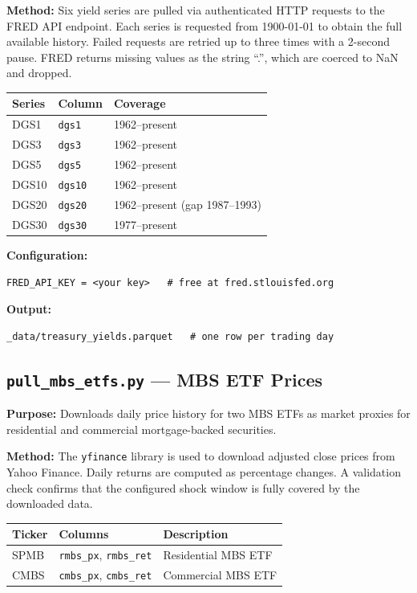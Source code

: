 \documentclass[12pt, a4paper]{article}
\begin{document}
\textbf{Method:} Six yield series are pulled via authenticated HTTP requests
to the FRED API endpoint. Each series is requested from 1900-01-01 to obtain
the full available history. Failed requests are retried up to three times with
a 2-second pause. FRED returns missing values as the string ``.'', which are
coerced to NaN and dropped.

\begin{center}
\begin{tabular}{lll}
\toprule
Series & Column & Coverage \\
\midrule
DGS1  & \texttt{dgs1}  & 1962--present \\
DGS3  & \texttt{dgs3}  & 1962--present \\
DGS5  & \texttt{dgs5}  & 1962--present \\
DGS10 & \texttt{dgs10} & 1962--present \\
DGS20 & \texttt{dgs20} & 1962--present (gap 1987--1993) \\
DGS30 & \texttt{dgs30} & 1977--present \\
\bottomrule
\end{tabular}
\end{center}

\textbf{Configuration:}
\begin{lstlisting}
FRED_API_KEY = <your key>   # free at fred.stlouisfed.org
\end{lstlisting}

\textbf{Output:}
\begin{lstlisting}
_data/treasury_yields.parquet   # one row per trading day
\end{lstlisting}

\subsection{\texttt{pull\_mbs\_etfs.py} --- MBS ETF Prices}

\textbf{Purpose:} Downloads daily price history for two MBS ETFs as market
proxies for residential and commercial mortgage-backed securities.

\textbf{Method:} The \texttt{yfinance} library is used to download adjusted
close prices from Yahoo Finance. Daily returns are computed as percentage
changes. A validation check confirms that the configured shock window is fully
covered by the downloaded data.

\begin{center}
\begin{tabular}{lll}
\toprule
Ticker & Columns & Description \\
\midrule
SPMB & \texttt{rmbs\_px}, \texttt{rmbs\_ret} & Residential MBS ETF \\
CMBS & \texttt{cmbs\_px}, \texttt{cmbs\_ret} & Commercial MBS ETF  \\
\bottomrule
\end{tabular}
\end{center}
\end{document}
